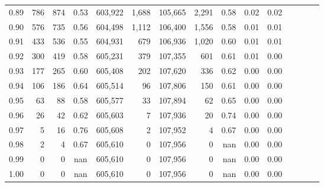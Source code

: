 \begin{tabular}{rrrcrrrrrrrrrrr}
0.89 &     786 &    874 &                                       0.53 &  603,922 &    1,688 &  105,665 &    2,291 &  0.58 &  0.02 &                         0.02 \\
0.90 &     576 &    735 &                                       0.56 &  604,498 &    1,112 &  106,400 &    1,556 &  0.58 &  0.01 &                         0.01 \\
0.91 &     433 &    536 &                                       0.55 &  604,931 &      679 &  106,936 &    1,020 &  0.60 &  0.01 &                         0.01 \\
0.92 &     300 &    419 &                                       0.58 &  605,231 &      379 &  107,355 &      601 &  0.61 &  0.01 &                         0.00 \\
0.93 &     177 &    265 &                                       0.60 &  605,408 &      202 &  107,620 &      336 &  0.62 &  0.00 &                         0.00 \\
0.94 &     106 &    186 &                                       0.64 &  605,514 &       96 &  107,806 &      150 &  0.61 &  0.00 &                         0.00 \\
0.95 &      63 &     88 &                                       0.58 &  605,577 &       33 &  107,894 &       62 &  0.65 &  0.00 &                         0.00 \\
0.96 &      26 &     42 &                                       0.62 &  605,603 &        7 &  107,936 &       20 &  0.74 &  0.00 &                         0.00 \\
0.97 &       5 &     16 &                                       0.76 &  605,608 &        2 &  107,952 &        4 &  0.67 &  0.00 &                         0.00 \\
0.98 &       2 &      4 &                                       0.67 &  605,610 &        0 &  107,956 &        0 &   nan &  0.00 &                         0.00 \\
0.99 &       0 &      0 &                                        nan &  605,610 &        0 &  107,956 &        0 &   nan &  0.00 &                         0.00 \\
1.00 &       0 &      0 &                                        nan &  605,610 &        0 &  107,956 &        0 &   nan &  0.00 &                         0.00 \\
\bottomrule
\end{tabular}
